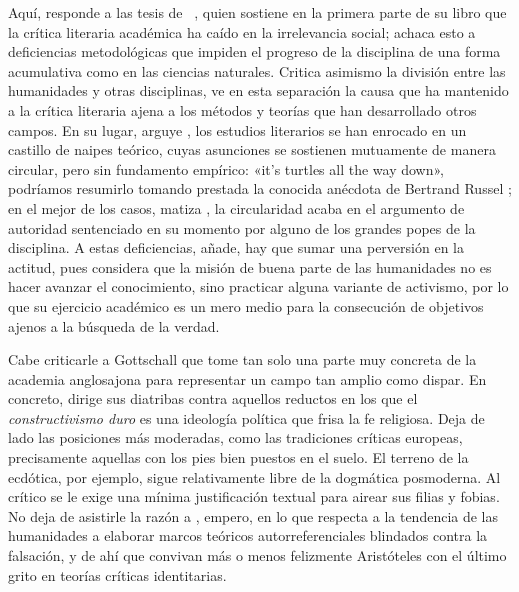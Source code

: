 Aquí, \citeauthor{cameron2011} responde a las tesis de \citeauthor{gottschall2008}~\parencite*{gottschall2010}, quien sostiene en la primera parte de su libro que la crítica literaria académica ha caído en la irrelevancia social; achaca esto a deficiencias metodológicas que impiden el progreso de la disciplina de una forma acumulativa como en las ciencias naturales. Critica asimismo la división entre las humanidades y otras disciplinas, ve en esta separación la causa que ha mantenido a la crítica literaria ajena a los métodos y teorías que han desarrollado otros campos. En su lugar, arguye \citeauthor{gottschall2008}, los estudios literarios se han enrocado en un castillo de naipes teórico, cuyas asunciones se sostienen mutuamente de manera circular, pero sin fundamento empírico: «it's turtles all the way down», podríamos resumirlo tomando prestada la conocida anécdota de Bertrand Russel \parencite{hawking1995}; en el mejor de los casos, matiza  \citeauthor{gottschall2008}, la circularidad acaba en el argumento de autoridad sentenciado en su momento por alguno de los grandes popes de la disciplina. A estas deficiencias, añade, hay que sumar una perversión en la actitud, pues considera que la misión de buena parte de las humanidades no es hacer avanzar el conocimiento, sino practicar alguna variante de activismo, por lo que su ejercicio académico es un mero medio para la consecución de objetivos ajenos a la búsqueda de la verdad.

Cabe criticarle a Gottschall que tome  tan solo una parte muy concreta de la academia anglosajona para representar un campo tan amplio como dispar. En concreto, dirige sus diatribas contra aquellos reductos en los que el \textit{constructivismo duro} es una ideología política que frisa la fe religiosa. Deja de lado las posiciones más moderadas, como las tradiciones críticas europeas, precisamente aquellas con los pies bien puestos en el suelo. El terreno de la ecdótica, por ejemplo, sigue relativamente libre de la dogmática posmoderna. Al crítico se le exige una mínima justificación textual para airear sus filias y fobias. No deja de asistirle la razón a \citeauthor{gottschall2008}, empero, en lo que respecta a la tendencia de las humanidades a elaborar marcos teóricos autorreferenciales blindados contra la falsación, y de ahí que convivan más o menos felizmente Aristóteles con el último grito en teorías críticas identitarias.

